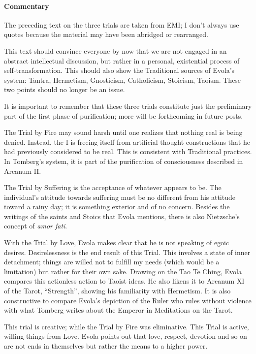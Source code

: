 \paragraph{Commentary}


The preceding text on the three trials are taken from EMI; I don't always use quotes because the material may have been abridged or rearranged.

This text should convince everyone by now that we are not engaged in an abstract intellectual discussion, but rather in a personal, existential process of self-transformation. This should also show the Traditional sources of Evola's system: Tantra, Hermetism, Gnosticism, Catholicism, Stoicism, Taoism. These two points should no longer be an issue.

It is important to remember that these three trials constitute just the preliminary part of the first phase of purification; more will be forthcoming in future posts.

The Trial by Fire may sound harsh until one realizes that nothing real is being denied. Instead, the I is freeing itself from artificial thought constructions that he had previously considered to be real. This is consistent with Traditional practices. In Tomberg's system, it is part of the purification of consciousness described in Arcanum II.

The Trial by Suffering is the acceptance of whatever appears to be. The individual's attitude towards suffering must be no different from his attitude toward a rainy day; it is something exterior and of no concern. Besides the writings of the saints and Stoics that Evola mentions, there is also Nietzsche's concept of \emph{amor fati}.

With the Trial by Love, Evola makes clear that he is not speaking of egoic desires. Desirelessness is the end result of this Trial. This involves a state of inner detachment; things are willed not to fulfill my needs (which would be a limitation) but rather for their own sake. Drawing on the Tao Te Ching, Evola compares this actionless action to Taoist ideas. He also likens it to Arcanum XI of the Tarot, ``Strength'', showing his familiarity with Hermetism. It is also constructive to compare Evola's depiction of the Ruler who rules without violence with what Tomberg writes about the Emperor in Meditations on the Tarot.

This trial is creative; while the Trial by Fire was eliminative. This Trial is active, willing things from Love. Evola points out that love, respect, devotion and so on are not ends in themselves but rather the means to a higher power.

